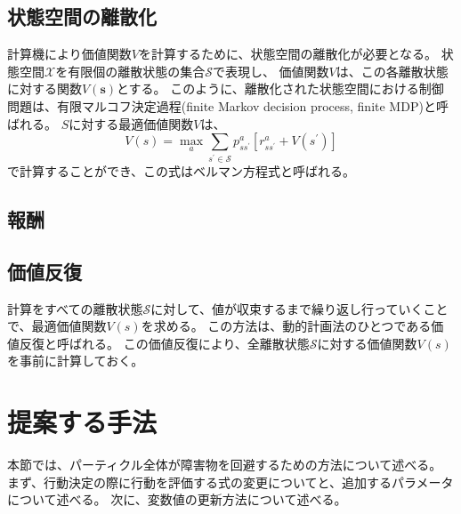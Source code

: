 \subsection{状態空間の離散化}
計算機により価値関数$V$を計算するために、状態空間の離散化が必要となる。
状態空間$\mathcal{X}$を有限個の離散状態の集合$\mathcal{S}$で表現し、
価値関数$V$は、この各離散状態に対する関数$V(\bm{s})$とする。
このように、離散化された状態空間における制御問題は、有限マルコフ決定過程(finite Markov decision process, finite MDP)と呼ばれる。
$S$に対する最適価値関数$V$は、
\begin{equation}
\label{bellman equation}
  V(s) = \max_{a} \sum_{s^{\prime} \in \mathcal{S}}
         p^{a}_{ss^{\prime}} \left[ r^{a}_{ss^{\prime}} + V(s^{\prime}) \right]
\end{equation}
で計算することができ、この式はベルマン方程式と呼ばれる。

\subsection{報酬} \label{subsection:報酬}


\subsection{価値反復}
計算をすべての離散状態$\mathcal{S}$に対して、値が収束するまで繰り返し行っていくことで、最適価値関数$V(s)$を求める。
この方法は、動的計画法のひとつである価値反復と呼ばれる。
この価値反復により、全離散状態$\mathcal{S}$に対する価値関数$V(s)$を事前に計算しておく。


\section{提案する手法} \label{section:回避重み}
本節では、パーティクル全体が障害物を回避するための方法について述べる。
まず、行動決定の際に行動を評価する式の変更についてと、追加するパラメータについて述べる。
次に、変数値の更新方法について述べる。

